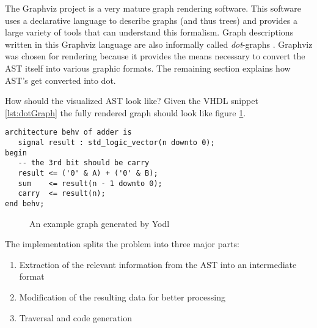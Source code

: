 The Graphviz project is a very mature graph rendering
software. This software uses a declarative language to describe graphs
(and thus trees) and provides a large variety of tools that can
understand this formalism. Graph descriptions written in this Graphviz
language are also informally called \emph{dot}-graphs \cite{DOT}.
Graphviz was chosen for rendering because it
provides the means necessary to convert the AST itself into various
graphic formats. The remaining section explains how AST's get
converted into dot.

How should the visualized AST look like?
Given the VHDL snippet \ref{lst:dotGraph}
the fully rendered graph should look like figure \ref{fig:simpleAdder}.

\begin{lstlisting}[style=vhdl,caption={Sample snippet for dot graph
      generator demonstration},label={lst:dotGraph}]
architecture behv of adder is
   signal result : std_logic_vector(n downto 0);
begin
   -- the 3rd bit should be carry
   result <= ('0' & A) + ('0' & B);
   sum    <= result(n - 1 downto 0);
   carry  <= result(n);
end behv;
\end{lstlisting}

\begin{figure}[tb]
    \centering
    
    \caption{An example graph generated by Yodl}
    \label{fig:simpleAdder}
\end{figure}

\noindent The implementation splits the problem into three major parts:
\begin{enumerate}
    \item Extraction of the relevant information from the AST into an
    intermediate format
    \item Modification of the resulting data for better processing
    \item Traversal and code generation
\end{enumerate}

